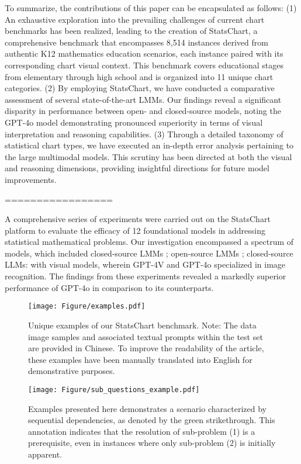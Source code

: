 To summarize, the contributions of this paper can be encapsulated as follows: (1) An exhaustive exploration into the prevailing challenges of current chart  benchmarks has been realized, leading to the creation of StatsChart, a comprehensive benchmark that encompasses 8,514 instances derived from authentic K12 mathematics education scenarios, each instance paired with its corresponding chart visual context. This benchmark covers educational stages from elementary through high school and is organized into 11 unique  chart categories. (2) By employing StatsChart, we have conducted a comparative assessment of several state-of-the-art LMMs. Our findings reveal a significant disparity in performance between open- and closed-source models, noting the GPT-4o model demonstrating pronounced superiority in terms of visual interpretation and reasoning capabilities. (3) Through a detailed taxonomy of statistical chart types, we have executed an in-depth error analysis pertaining to the large multimodal models. This scrutiny has been directed  at both the visual and reasoning dimensions, providing insightful directions for future model improvements.

=================

A comprehensive series of experiments were carried out on the StatsChart platform to evaluate the efficacy of 12 foundational models in addressing statistical mathematical problems. Our investigation encompassed a spectrum of models, which included closed-source LMMs \citep{openai2024gpt4o, openai2023gpt4v, Qwen-VL}; open-source LMMs \citep{internvl-1.2, internvl-1.5, internlmxcomposer2, liu2024llavanext, lu2024deepseekvl, Qwen-VL, hpt1.0}; closed-source LLMs: \citep{openai2023gpt4} with visual models, wherein GPT-4V and GPT-4o specialized in image recognition. The findings from these experiments revealed a markedly superior performance of GPT-4o in comparison to its counterparts. 




\begin{figure}
  \centering
  \texttt{[image: Figure/examples.pdf]}
  \caption{Unique examples of our StatsChart benchmark. Note: The data image samples and associated textual prompts within the test set are provided in Chinese. To improve the readability of the article, these examples have been manually translated into English for demonstrative purposes.}
    \label{fig:examples}
\end{figure}


\begin{figure}
  \centering
  \texttt{[image: Figure/sub\_questions\_example.pdf]}
  \caption{Examples presented here demonstrates a scenario characterized by sequential dependencies, as denoted by the green strikethrough. This annotation indicates that the resolution of sub-problem (1) is a prerequisite, even in instances where only sub-problem (2) is initially apparent.}
    \label{fig:sub_questions_example}
\end{figure}